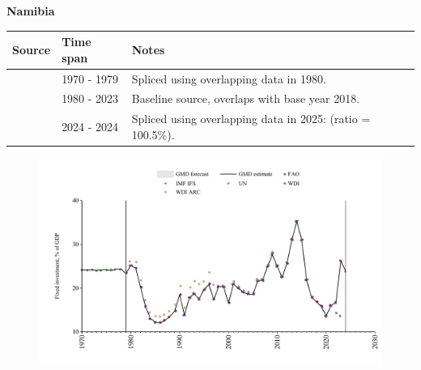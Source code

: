 \documentclass[12pt,a4paper,landscape]{article}
\begin{document}
\begin{adjustbox}{max totalsize={\paperwidth}{\paperheight},center}
\begin{minipage}[t][\textheight][t]{\textwidth}
\vspace*{0.5cm}
{}
\begin{center}
{\Large\bfseries Namibia}
\end{center}
\vspace{0.5cm}
\begin{table}[H]
\centering
\small
\begin{tabular}{|l|l|l|}
\hline
\textbf{Source} & \textbf{Time span} & \textbf{Notes} \\
\hline
\rowcolor{white}\cite{UN}& 1970 - 1979 &Spliced using overlapping data in 1980.\\
\rowcolor{lightgray}\cite{WDI}& 1980 - 2023 &Baseline source, overlaps with base year 2018.\\
\rowcolor{white}\cite{IMF_IFS}& 2024 - 2024 &Spliced using overlapping data in 2025: (ratio = 100.5\%).\\
\hline
\end{tabular}
\end{table}
\begin{figure}[H]
\centering
\includegraphics[width=\textwidth,height=0.6\textheight,keepaspectratio]{graphs/NAM_finv_GDP.pdf}
\end{figure}
\end{minipage}
\end{adjustbox}
\end{document}
